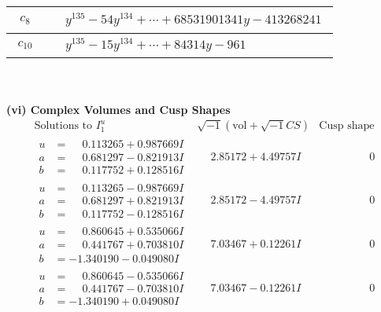 \documentclass[1p]{elsarticle_modified}
\theoremstyle{definition}
\newcommand{\I}{\sqrt{-1}}
\begin{document}
\begin{tabular}{m{50pt}|m{274pt}}
\hline $$\begin{aligned}c_{8}\end{aligned}$$&$\begin{aligned}
&y^{135}-54 y^{134}+\cdots+68531901341 y-413268241
\end{aligned}$\\
\hline $$\begin{aligned}c_{10}\end{aligned}$$&$\begin{aligned}
&y^{135}-15 y^{134}+\cdots+84314 y-961
\end{aligned}$\\
\hline
\end{tabular}\\~\\
\newpage\flushleft \textbf{(vi) Complex Volumes and Cusp Shapes}
$$\begin{array}{c|c|c}  
\text{Solutions to }I^u_{1}& \I (\text{vol} + \sqrt{-1}CS) & \text{Cusp shape}\\
 \hline 
\begin{aligned}
u &= \phantom{-}0.113265 + 0.987669 I \\
a &= \phantom{-}0.681297 - 0.821913 I \\
b &= \phantom{-}0.117752 + 0.128516 I\end{aligned}
 & \phantom{-}2.85172 + 4.49757 I & \phantom{-0.000000 } 0 \\ \hline\begin{aligned}
u &= \phantom{-}0.113265 - 0.987669 I \\
a &= \phantom{-}0.681297 + 0.821913 I \\
b &= \phantom{-}0.117752 - 0.128516 I\end{aligned}
 & \phantom{-}2.85172 - 4.49757 I & \phantom{-0.000000 } 0 \\ \hline\begin{aligned}
u &= \phantom{-}0.860645 + 0.535066 I \\
a &= \phantom{-}0.441767 + 0.703810 I \\
b &= -1.340190 - 0.049080 I\end{aligned}
 & \phantom{-}7.03467 + 0.12261 I & \phantom{-0.000000 } 0 \\ \hline\begin{aligned}
u &= \phantom{-}0.860645 - 0.535066 I \\
a &= \phantom{-}0.441767 - 0.703810 I \\
b &= -1.340190 + 0.049080 I\end{aligned}
 & \phantom{-}7.03467 - 0.12261 I & \phantom{-0.000000 } 0 \\ \hline\begin{aligned}

\end{aligned}
\end{array}$$
\end{document}
